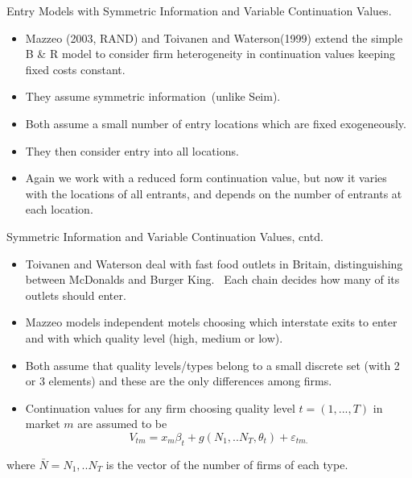 \documentclass[aspectratio=169,11pt]{beamer}
\begin{document}
\begin{frame}{Entry Models with Symmetric Information and Variable
Continuation Values.}
\begin{itemize}
\item Mazzeo (2003, RAND) and Toivanen and Waterson(1999) extend the simple
B \& R model to consider firm heterogeneity in continuation values keeping
fixed costs constant.
\item They assume symmetric information\ (unlike Seim).
\item Both assume a small number of entry locations which are fixed
exogeneously.
\item They then consider entry into all locations.
\item Again we work with a reduced form continuation value, but now it
varies with the locations of all entrants, and depends on the number of
entrants at each location.
\end{itemize}
\end{frame}

\begin{frame}{Symmetric Information and Variable Continuation Values,
cntd.}
\begin{itemize}
\item Toivanen and Waterson deal with fast food outlets in Britain,
distinguishing between McDonalds and Burger King. \ Each chain decides how
many of its outlets should enter.
\item Mazzeo models independent motels choosing which interstate exits to
enter and with which quality level (high, medium or low).
\item Both assume that quality levels/types belong to a small discrete set
(with 2 or 3 elements) and these are the only differences among firms.
\item Continuation values for any firm choosing quality level $t=(1,...,T)$
in market $m$ are assumed to be 
\begin{equation*}
V_{tm}=x_{m}\beta _{t}+g(N_{1},..N_{T},\theta _{t})+\varepsilon _{tm.}
\end{equation*}
\end{itemize}
where $\bar{N}=N_{1},..N_{T}$ is the vector of the number of firms of each
type.
\end{frame}
\end{document}
